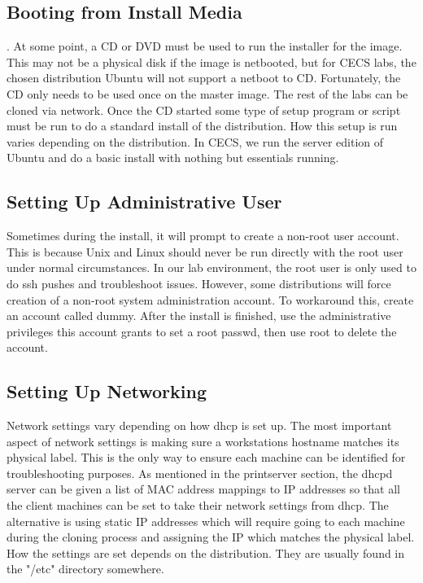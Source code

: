 \subsection{Booting from Install Media}.
At some point, a CD or DVD must be used to run the installer for the image.  This may not be a physical disk if the image is netbooted, but for CECS labs, the chosen distribution Ubuntu will not support a netboot to CD.  Fortunately, the CD only needs to be used once on the master image.  The rest of the labs can be cloned via network.  Once the CD started some type of setup program or script must be run to do a standard install of the distribution.  How this setup is run varies depending on the distribution.  In CECS, we run the server edition of Ubuntu and do a basic install with nothing but essentials running.  
\subsection{Setting Up Administrative User}
Sometimes during the install, it will prompt to create a non-root user account.  This is because Unix and Linux should never be run directly with the root user under normal circumstances.  In our lab environment, the root user is only used to do ssh pushes and troubleshoot issues.  However, some distributions will force creation of a non-root system administration account.  To workaround this, create an account called dummy.  After the install is finished, use the administrative privileges this account grants to set a root passwd, then use root to delete the account.  
\subsection{Setting Up Networking}
Network settings vary depending on how dhcp is set up.  The most important aspect of network settings is making sure a workstations hostname matches its physical label.  This is the only way to ensure each machine can be identified for troubleshooting purposes.  As mentioned in the printserver section, the dhcpd server can be given a list of MAC address mappings to IP addresses so that all the client machines can be set to take their network settings from dhcp.  The alternative is using static IP addresses which will require going to each machine during the cloning process and assigning the IP which matches the physical label.  How the settings are set depends on the distribution.  They are usually found in the "/etc" directory somewhere.  

